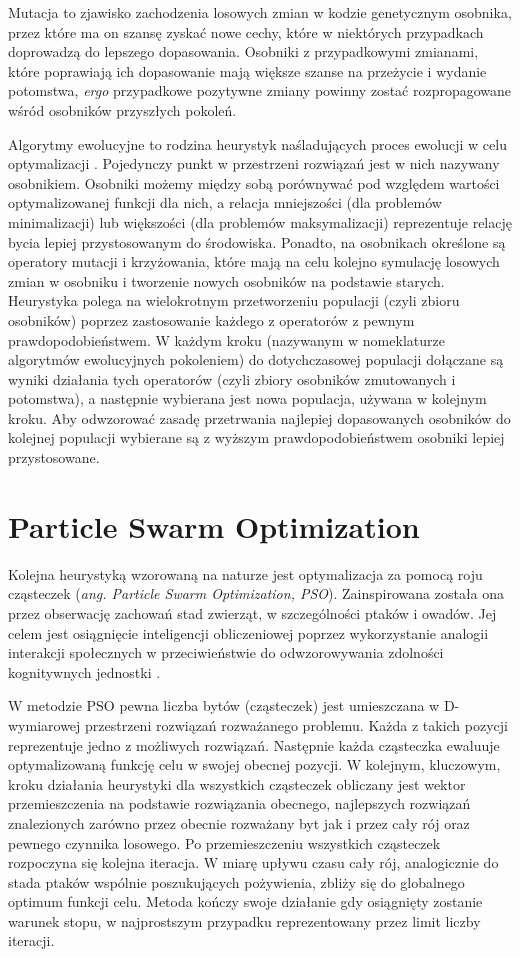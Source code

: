 \documentclass[11pt,a4paper,oneside]{report}
\begin{document}
Mutacja to zjawisko zachodzenia losowych zmian w kodzie genetycznym osobnika, przez które ma on szansę zyskać nowe cechy, które w niektórych przypadkach doprowadzą do lepszego dopasowania. Osobniki z przypadkowymi zmianami, które poprawiają ich dopasowanie mają większe szanse na przeżycie i wydanie potomstwa, \textit{ergo} przypadkowe pozytywne zmiany powinny zostać rozpropagowane wśród osobników przyszłych pokoleń.

Algorytmy ewolucyjne to rodzina heurystyk naśladujących proces ewolucji w celu optymalizacji \cite{davis1991handbook}. Pojedynczy punkt w przestrzeni rozwiązań jest w nich nazywany osobnikiem. Osobniki możemy między sobą porównywać pod względem wartości optymalizowanej funkcji dla nich, a relacja mniejszości (dla problemów minimalizacji) lub większości (dla problemów maksymalizacji) reprezentuje relację bycia lepiej przystosowanym do środowiska. Ponadto, na osobnikach określone są operatory mutacji i krzyżowania, które mają na celu kolejno symulację losowych zmian w osobniku i tworzenie nowych osobników na podstawie starych. Heurystyka polega na wielokrotnym przetworzeniu populacji (czyli zbioru osobników) poprzez zastosowanie każdego z operatorów z pewnym prawdopodobieństwem. W każdym kroku (nazywanym w nomeklaturze algorytmów ewolucyjnych pokoleniem) do dotychczasowej populacji dołączane są wyniki działania tych operatorów (czyli zbiory osobników zmutowanych i potomstwa), a następnie wybierana jest nowa populacja, używana w kolejnym kroku. Aby odwzorować zasadę przetrwania najlepiej dopasowanych osobników do kolejnej populacji wybierane są z wyższym prawdopodobieństwem osobniki lepiej przystosowane.


\section{Particle Swarm Optimization}

Kolejna heurystyką wzorowaną na naturze jest optymalizacja za pomocą roju cząsteczek (\textit{ang. Particle Swarm Optimization, PSO}). Zainspirowana została ona przez obserwację zachowań stad zwierząt, w szczególności ptaków i owadów. Jej celem jest osiągnięcie inteligencji obliczeniowej poprzez wykorzystanie analogii interakcji społecznych w przeciwieństwie do odwzorowywania zdolności kognitywnych jednostki \cite{poli2007particle}. 

W metodzie PSO pewna liczba bytów (cząsteczek) jest umieszczana w D-wymiarowej przestrzeni rozwiązań rozważanego problemu. Każda z takich pozycji reprezentuje jedno z możliwych rozwiązań. Następnie każda cząsteczka ewaluuje optymalizowaną funkcję celu w swojej obecnej pozycji. W kolejnym, kluczowym, kroku działania heurystyki dla wszystkich cząsteczek obliczany jest wektor przemieszczenia na podstawie rozwiązania obecnego, najlepszych rozwiązań znalezionych zarówno przez obecnie rozważany byt jak i przez cały rój oraz pewnego czynnika losowego. Po przemieszczeniu wszystkich cząsteczek rozpoczyna się kolejna iteracja. W miarę upływu czasu cały rój, analogicznie do stada ptaków wspólnie poszukujących pożywienia, zbliży się do globalnego optimum funkcji celu. Metoda kończy swoje działanie gdy osiągnięty zostanie warunek stopu, w najprostszym przypadku reprezentowany przez limit liczby iteracji. 
\end{document}
